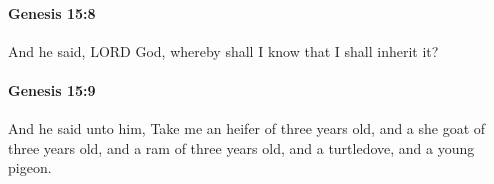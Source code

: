 		\paragraph{Genesis 15:8} %
			\label{GENESIS-15-8}

			And he said, LORD God, whereby shall I know that I shall inherit it?


		\paragraph{Genesis 15:9} %
			\label{GENESIS-15-9}

			And he said unto him, Take me an heifer of three years old, and a she goat of three years old, and a ram of three years old, and a turtledove, and a young pigeon.


